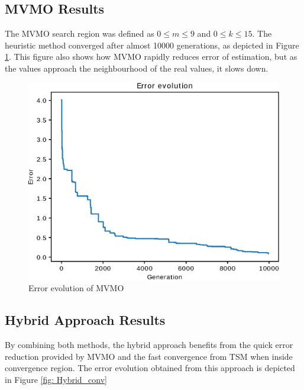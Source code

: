 \subsection{MVMO Results}

The MVMO search region was defined as $0 \leq m \leq 9$ and $0 \leq k \leq 15$. The heuristic method converged after almost 10000 generations, as depicted in Figure \ref{fig: MVMO_conv}. This figure also shows how MVMO rapidly reduces error of estimation, but as the values approach the neighbourhood of the real values, it slows down.

\begin{figure}[h]
	\caption{Error evolution of MVMO}
	\begin{center}
		\includegraphics[scale=0.7]{Images/MVMO_conv.eps}
	\end{center}
	\label{fig: MVMO_conv}
\end{figure}

\subsection{Hybrid Approach Results}

By combining both methods, the hybrid approach benefits from the quick error reduction provided by MVMO and the fast convergence from TSM when inside convergence region. The error evolution obtained from this approach is depicted in Figure \ref{fig: Hybrid_conv}

